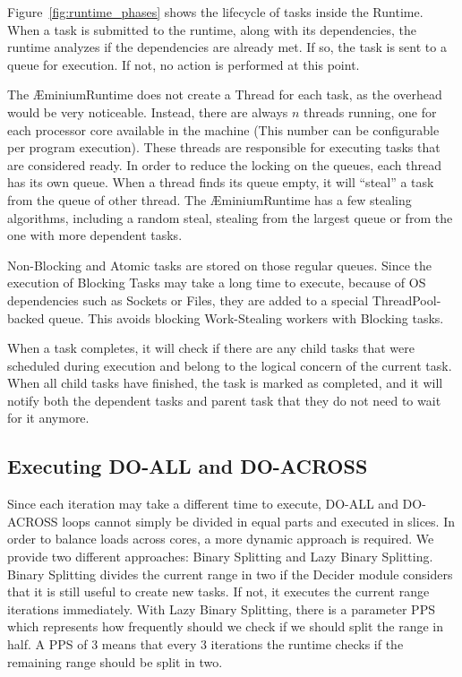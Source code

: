 \documentclass[smallextended]{svjour3}
\begin{document}
Figure~\ref{fig:runtime_phases} shows the lifecycle of tasks inside the Runtime. When a task is submitted to the runtime, along with its dependencies, the runtime analyzes if the dependencies are already met. If so, the task is sent to a queue for execution. If not, no action is performed at this point.


The ÆminiumRuntime does not create a Thread for each task, as the overhead would be very noticeable. Instead, there are always $n$ threads running, one for each processor core available in the machine (This number can be configurable per program execution). These threads are responsible for executing tasks that are considered ready. In order to reduce the locking on the queues, each thread has its own queue. When a thread finds its queue empty, it will ``steal'' a task from the queue of other thread. The ÆminiumRuntime has a few stealing algorithms, including a random steal, stealing from the largest queue or from the one with more dependent tasks.

Non-Blocking and Atomic tasks are stored on those regular queues. Since the execution of Blocking Tasks may take a long time to execute, because of OS dependencies such as Sockets or Files, they are added to a special ThreadPool-backed queue. This avoids blocking Work-Stealing workers with Blocking tasks.

When a task completes, it will check if there are any child tasks that were scheduled during execution and belong to the logical concern of the current task. When all child tasks have finished, the task is marked as completed, and it will notify both the dependent tasks and parent task that they do not need to wait for it anymore.


\subsection{Executing DO-ALL and DO-ACROSS}

Since each iteration may take a different time to execute, DO-ALL and DO-ACROSS loops cannot simply be divided in equal parts and executed in slices. In order to balance loads across cores, a more dynamic approach is required. We provide two different approaches: Binary Splitting and Lazy Binary Splitting\cite{tzannes2010lazy}. Binary Splitting divides the current range in two if the Decider module considers that it is still useful to create new tasks. If not, it executes the current range iterations immediately. With Lazy Binary Splitting, there is a parameter PPS which represents how frequently should we check if we should split the range in half. A PPS of 3 means that every 3 iterations the runtime checks if the remaining range should be split in two.
\end{document}
